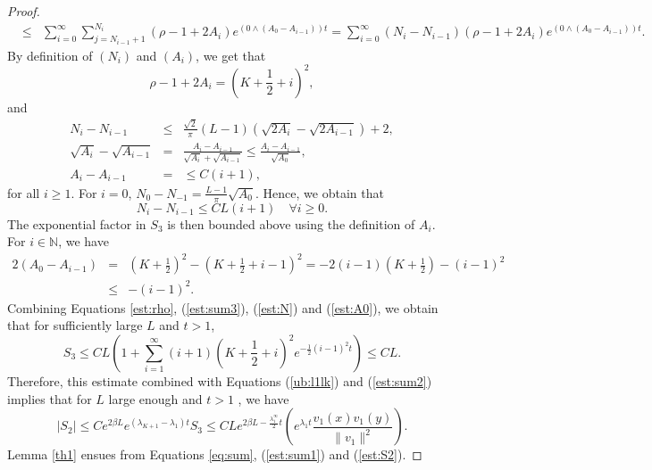 \documentclass[11pt]{article}
\theoremstyle{plain}
\newcommand\linf{\lambda_1^\infty}
\begin{document}
\begin{proof}
\begin{eqnarray}
&\leqslant & \sum_{i=0}^\infty\sum_{j=N_{i-1}+1}^{N_i}(\rho-1+2A_i)e^{(0\wedge(A_0-A_{i-1}))t}
=\sum_{i=0}^\infty(N_i-N_{i-1})(\rho-1+2A_i)e^{(0\wedge(A_0-A_{i-1}))t}.\nonumber
\end{eqnarray}
By definition of $(N_i)$ and $(A_i)$, we get that 
\begin{equation}
       \rho-1+2A_i=\left(K+\frac{1}{2}+i\right)^2, \label{est:rho}
\end{equation}
and 
\begin{eqnarray*}
    N_i-N_{i-1}
    &\leqslant&\frac{\sqrt{2}}{\pi}(L-1)\left(\sqrt{2A_i}-\sqrt{2A_{i-1}}\right)+2, \\
\sqrt{A_i}-\sqrt{A_{i-1}}&=&\frac{A_i-A_{i-1}}{\sqrt{A_i}+\sqrt{A_{i-1}}}\leqslant \frac{A_i-A_{i-1}}{\sqrt{A_0}},\\
A_i-A_{i-1}&=&\leqslant C(i+1),
\end{eqnarray*}
for all $i\geqslant 1$. For $i=0$,  $N_0-N_{-1}=\frac{L-1}{\pi}\sqrt{A_0}$. Hence, we obtain that  \begin{equation}
 N_i-N_{i-1}\leqslant C L (i+1) \quad \forall i\geqslant 0.
 \label{est:N}
 \end{equation}
The exponential factor in $S_3$ is then bounded above using the definition of $A_i$. For $i\in\mathbb{N}$, we have 
\begin{eqnarray}
2(A_0-A_{i-1})&=&\left(K+\frac{1}{2}\right)^2-\left(K+\frac{1}{2}+i-1\right)^2=-2(i-1)\left(K+\frac{1}{2}\right)-(i-1)^2\nonumber\\
&\leqslant&-(i-1)^2.
\label{est:A0}
\end{eqnarray}
Combining Equations \eqref{est:rho}, (\ref{est:sum3}), (\ref{est:N}) and (\ref{est:A0}), we obtain that for sufficiently large $L$ and $t>1$,
\begin{equation}
    S_3\leqslant CL\left(1+\sum_{i=1}^\infty(i+1)\left(K+\frac{1}{2}+i\right)^2e^{-\frac{1}{2}(i-1)^2t}\right)\leqslant CL. \label{ub:S3}
\end{equation}
Therefore, this estimate combined with Equations (\ref{ub:l1lk}) and (\ref{est:sum2}) implies that for $L$ large enough and $t>1$ , we have
\begin{equation}
\left|S_2\right|\leqslant Ce^{2\beta L}e^{(\lambda_{K+1}-\lambda_1)t}S_3\leqslant CLe^{2\beta L-\frac{\linf}{2}t}\left(e^{\lambda_1 t}\frac{v_1(x)v_1(y)}{\|v_1\|^2}\right).
\label{est:S2} 
\end{equation}
Lemma \ref{th1} ensues from  Equations \eqref{eq:sum}, (\ref{est:sum1}) and (\ref{est:S2}).  
\end{proof}
\end{document}
